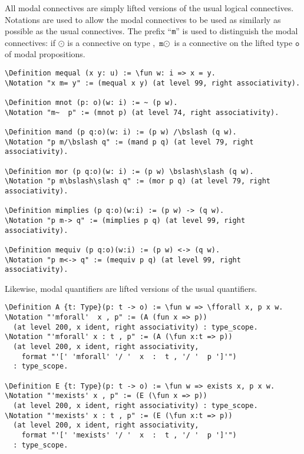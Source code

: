 \documentclass{llncs}
\newcommand{\red}[1]{\textcolor[rgb]{1,0,0}{#1}}
\newcommand{\blue}[1]{\textcolor[rgb]{0,0,1}{#1}}
\newcommand{\Definition}{\red{Definition}}
\newcommand{\Notation}{\blue{Notation}}
\newcommand{\fforall}{\blue{forall}}
\newcommand{\fun}{\blue{fun}}
\newcommand{\bslash}{\symbol{92}}
\begin{document}
\noindent
All modal connectives are simply lifted versions of the usual logical connectives. Notations are used to allow the modal connectives to be used as similarly as possible as the usual connectives. The prefix ``\texttt{m}'' is used to distinguish the modal connectives: if $\odot$ is a connective on type , $\texttt{m}\odot$ is a connective on the lifted type $\texttt{o}$ of modal propositions.  

\begin{Verbatim}[commandchars=\\\{\},fontsize=\verbsize]
\Definition mequal (x y: u) := \fun w: i => x = y.
\Notation "x m= y" := (mequal x y) (at level 99, right associativity).

\Definition mnot (p: o)(w: i) := ~ (p w).
\Notation "m~  p" := (mnot p) (at level 74, right associativity).

\Definition mand (p q:o)(w: i) := (p w) /\bslash (q w).
\Notation "p m/\bslash q" := (mand p q) (at level 79, right associativity).

\Definition mor (p q:o)(w: i) := (p w) \bslash\slash (q w).
\Notation "p m\bslash\slash q" := (mor p q) (at level 79, right associativity).

\Definition mimplies (p q:o)(w:i) := (p w) -> (q w).
\Notation "p m-> q" := (mimplies p q) (at level 99, right associativity).

\Definition mequiv (p q:o)(w:i) := (p w) <-> (q w).
\Notation "p m<-> q" := (mequiv p q) (at level 99, right associativity).
\end{Verbatim}

\noindent
Likewise, modal quantifiers are lifted versions of the usual quantifiers.

\begin{Verbatim}[commandchars=\\\{\},fontsize=\verbsize]
\Definition A {t: Type}(p: t -> o) := \fun w => \fforall x, p x w.
\Notation "'mforall'  x , p" := (A (fun x => p))
  (at level 200, x ident, right associativity) : type_scope.
\Notation "'mforall' x : t , p" := (A (\fun x:t => p))
  (at level 200, x ident, right associativity, 
    format "'[' 'mforall' '/ '  x  :  t , '/ '  p ']'")
  : type_scope.

\Definition E {t: Type}(p: t -> o) := \fun w => exists x, p x w.
\Notation "'mexists' x , p" := (E (\fun x => p))
  (at level 200, x ident, right associativity) : type_scope.
\Notation "'mexists' x : t , p" := (E (\fun x:t => p))
  (at level 200, x ident, right associativity, 
    format "'[' 'mexists' '/ '  x  :  t , '/ '  p ']'")
  : type_scope.
\end{Verbatim}
\end{document}
